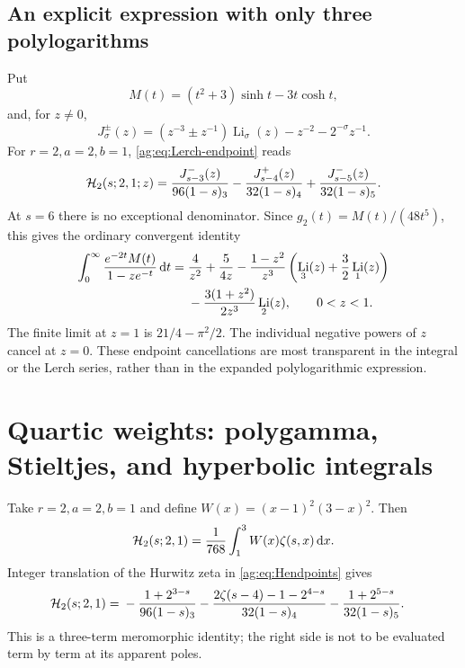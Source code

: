 \documentclass[11pt,letterpaper]{article}
\numberwithin{equation}{section}
\theoremstyle{definition}\newtheorem{definition}[theorem]{Definition}
\theoremstyle{remark}\newtheorem{remark}[theorem]{Remark}
\newcommand{\dd}{\,\mathrm d}\newcommand{\ii}{\mathrm i}
\DeclareMathOperator{\Li}{Li}\DeclareMathOperator{\Shi}{Shi}
\begin{document}
\subsection{An explicit expression with only three polylogarithms}
Put
\[
 M(t)=(t^2+3)\sinh t-3t\cosh t,
\]
and, for $z\ne0$,
\[
 J_\sigma^\pm(z)=(z^{-3}\pm z^{-1})\Li_\sigma(z)
                                  -z^{-2}-2^{-\sigma}z^{-1}.
\]
For $r=2,a=2,b=1$, \eqref{ag:eq:Lerch-endpoint} reads
\begin{equation}\label{ag:eq:r2-Lerch}
 \mathcal H_2(s;2,1;z)=\frac{J_{s-3}^-(z)}{96(1-s)_3}
       -\frac{J_{s-4}^+(z)}{32(1-s)_4}
       +\frac{J_{s-5}^-(z)}{32(1-s)_5}.
\end{equation}
At $s=6$ there is no exceptional denominator. Since
$g_2(t)=M(t)/(48t^5)$, this gives the ordinary convergent identity
\begin{align}
 \int_0^\infty\frac{e^{-2t}M(t)}{1-ze^{-t}}\dd t
 ={}&\frac4{z^2}+\frac5{4z}
 -\frac{1-z^2}{z^3}\left(\Li_3(z)+\frac32\Li_1(z)\right)\notag\\
 &-\frac{3(1+z^2)}{2z^3}\Li_2(z),\qquad 0<z<1.
 \label{ag:eq:three-polylogs}
\end{align}
The finite limit at $z=1$ is $21/4-\pi^2/2$. The individual negative
powers of $z$ cancel at $z=0$. These endpoint cancellations are most
transparent in the integral or the Lerch series, rather than in the
expanded polylogarithmic expression.



\section{Quartic weights: polygamma, Stieltjes, and hyperbolic integrals}
\label{ag:sec:examples}

Take $r=2,a=2,b=1$ and define $W(x)=(x-1)^2(3-x)^2$. Then
\begin{equation}\label{ag:eq:r2-compact}
 \HH_2(s;2,1)=\frac1{768}\int_1^3W(x)\zeta(s,x)\dd x.
\end{equation}
Integer translation of the Hurwitz zeta in
\eqref{ag:eq:Hendpoints} gives
\begin{align}
 \mathcal H_2(s;2,1)={}&-\frac{1+2^{3-s}}{96(1-s)_3}
 -\frac{2\zeta(s-4)-1-2^{4-s}}{32(1-s)_4}
 -\frac{1+2^{5-s}}{32(1-s)_5}.
 \label{ag:eq:r2-Riemann}
\end{align}
This is a three-term meromorphic identity; the right side is not to be
evaluated term by term at its apparent poles.
\end{document}
